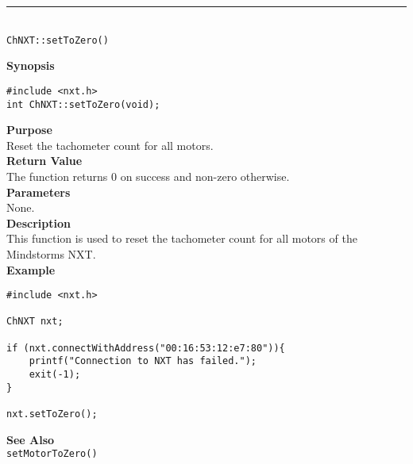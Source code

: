 \noindent
\vspace{5pt}
\rule{4.5in}{0.015in}\\
\noindent
{\LARGE \texttt{ChNXT::setToZero()} }\\


\noindent
{\bf Synopsis}
\begin{lstlisting}
#include <nxt.h>
int ChNXT::setToZero(void);
\end{lstlisting}

\noindent
{\bf Purpose}\\
Reset the tachometer count for all motors.\\

\noindent
{\bf Return Value}\\
The function returns 0 on success and non-zero otherwise.\\

\noindent
{\bf Parameters}\\
None.\\

\noindent
{\bf Description}\\
This function is used to reset the tachometer count for 
all motors of the Mindstorms NXT.\\

\noindent
{\bf Example}
\begin{lstlisting}
#include <nxt.h> 

ChNXT nxt;

if (nxt.connectWithAddress("00:16:53:12:e7:80")){
    printf("Connection to NXT has failed.");
    exit(-1);
}
    
nxt.setToZero();
\end{lstlisting}

\noindent
{\bf See Also}\\
\texttt{setMotorToZero()}\\
